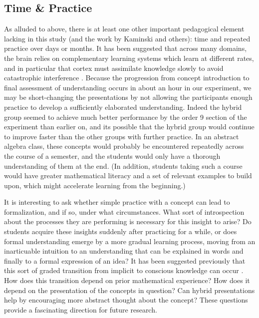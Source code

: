 \documentclass[man,10pt]{apa6}
\begin{document}
\subsection{Time \& Practice}
As alluded to above, there is at least one other important pedagogical element lacking in this study (and the work by Kaminski and others): time and repeated practice over days or months. It has been suggested that across many domains, the brain relies on complementary learning systems which learn at different rates, and in particular that cortex must assimilate knowledge slowly to avoid catastrophic interference \cite{Kumaran2016}. Because the progression from concept introduction to final assessment of understanding occurs in about an hour in our experiment, we may be short-changing the presentations by not allowing the participants enough practice to develop a sufficiently elaborated understanding. Indeed the hybrid group seemed to achieve much better performance by the order 9 section of the experiment than earlier on, and its possible that the hybrid group would continue to improve faster than the other groups with further practice. In an abstract algebra class, these concepts would probably be encountered repeatedly across the course of a semester, and the students would only have a thorough understanding of them at the end. (In addition, students taking such a course would have greater mathematical literacy and a set of relevant examples to build upon, which might accelerate learning from the beginning.)\par
It is interesting to ask whether simple practice with a concept can lead to formalization, and if so, under what circumstances. What sort of introspection about the processes they are performing is necessary for this insight to arise? Do students acquire these insights suddenly after practicing for a while, or does formal understanding emerge by a more gradual learning process, moving from an inarticuable intuition to an understanding that can be explained in words and finally to a formal expression of an idea? It has been suggested previously that this sort of graded transition from implicit to conscious knowledge can occur \cite{Cleeremans2002}. How does this transition depend on prior mathematical experience? How does it depend on the presentation of the concepts in question? Can hybrid presentations help by encouraging more abstract thought about the concept? These questions provide a fascinating direction for future research. 
\end{document}
